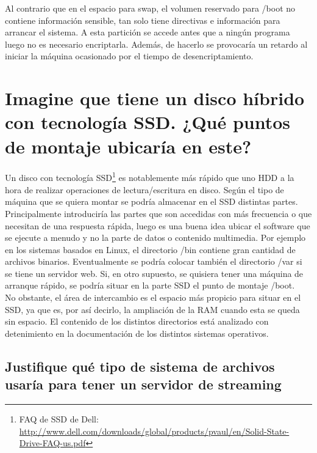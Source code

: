 Al contrario que en el espacio para swap, el volumen reservado para /boot\cite{dir} no contiene información sensible, tan solo tiene directivas e información para arrancar
el sistema. A esta partición se accede antes que a ningún programa luego no es necesario encriptarla. Además, de hacerlo se provocaría un retardo al iniciar la máquina 
ocasionado por el tiempo de desencriptamiento.







\section{Imagine que tiene un disco híbrido con tecnología SSD. ¿Qué puntos de montaje ubicaría en este?}

Un disco con tecnología SSD\footnote{FAQ de SSD de Dell: \url{http://www.dell.com/downloads/global/products/pvaul/en/Solid-State-Drive-FAQ-us.pdf}}
es notablemente más rápido  que uno HDD a la hora de realizar operaciones de lectura/escritura en disco.
Según el tipo de máquina que se quiera montar se podría almacenar en el SSD distintas partes. Principalmente introduciría las partes 
que son accedidas con más frecuencia o que necesitan de una respuesta rápida, luego es una buena idea ubicar el software que se
ejecute a menudo y no la parte de datos o contenido multimedia. Por ejemplo en los sistemas basados en Linux, el directorio /bin contiene gran cantidad 
de archivos binarios. Eventualmente se podría colocar también el directorio /var si se tiene un servidor web. Si, en otro supuesto, se quisiera tener una máquina de
arranque rápido, se podría situar en la parte SSD el punto de montaje /boot. \\

No obstante, el área de intercambio\cite{dir} es el espacio más propicio para situar en el SSD, ya que es, por así decirlo, la ampliación de la RAM cuando esta se queda 
sin espacio. El contenido de los distintos directorios está analizado con detenimiento en la documentación de los distintos sistemas operativos.

\subsection{Justifique qué tipo de sistema de archivos usaría para tener un servidor de streaming}

